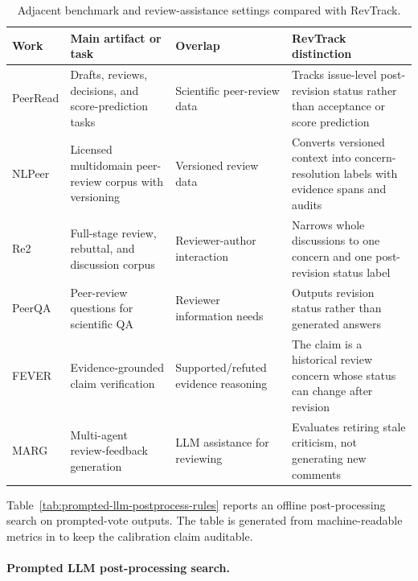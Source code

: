\begin{table}[t]
\centering
\scriptsize
\setlength{\tabcolsep}{3pt}
\begin{tabular}{p{}p{}p{}p{}}
\toprule
Work & Main artifact or task & Overlap & RevTrack distinction \\
\midrule
PeerRead \citep{kang-etal-2018-dataset} & Drafts, reviews, decisions, and score-prediction tasks & Scientific peer-review data & Tracks issue-level post-revision status rather than acceptance or score prediction \\
NLPeer \citep{dycke-etal-2023-nlpeer} & Licensed multidomain peer-review corpus with versioning & Versioned review data & Converts versioned context into concern-resolution labels with evidence spans and audits \\
Re2 \citep{zhang-etal-2025-re2} & Full-stage review, rebuttal, and discussion corpus & Reviewer-author interaction & Narrows whole discussions to one concern and one post-revision status label \\
PeerQA \citep{baumgartner-etal-2025-peerqa} & Peer-review questions for scientific QA & Reviewer information needs & Outputs revision status rather than generated answers \\
FEVER \citep{thorne-etal-2018-fever} & Evidence-grounded claim verification & Supported/refuted evidence reasoning & The claim is a historical review concern whose status can change after revision \\
MARG \citep{darcy-etal-2024-marg} & Multi-agent review-feedback generation & LLM assistance for reviewing & Evaluates retiring stale criticism, not generating new comments \\
\bottomrule
\end{tabular}
\caption{Adjacent benchmark and review-assistance settings compared with RevTrack.}
\label{tab:related-comparison}
\end{table}

Table~\ref{tab:prompted-llm-postprocess-rules} reports an offline post-processing search on prompted-vote outputs.
The table is generated from machine-readable metrics in  to keep the calibration claim auditable.

\paragraph{Prompted LLM post-processing search.}


